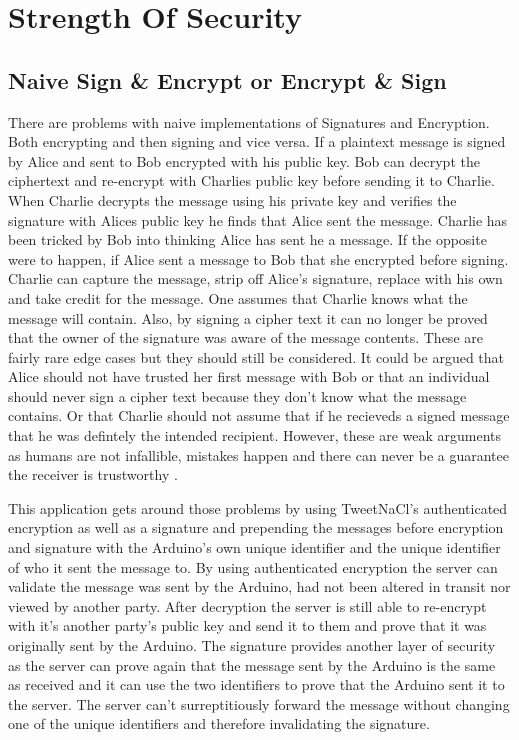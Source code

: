 
\chapter{Strength Of Security}
\label{stre}


\section{Naive Sign \& Encrypt or Encrypt \& Sign}

There are problems with naive implementations of Signatures and Encryption. Both encrypting and then signing and vice versa. If a plaintext message is signed by Alice and sent to Bob encrypted with his public key. Bob can decrypt the ciphertext and re-encrypt with Charlies public key before sending it to Charlie. When Charlie decrypts the message using his private key and verifies the signature with Alices public key he finds that Alice sent the message. Charlie has been tricked by Bob into thinking Alice has sent he a message. If the opposite were to happen, if Alice sent a message to Bob that she encrypted before signing. Charlie can capture the message, strip off Alice's signature, replace with his own and take credit for the message. One assumes that Charlie knows what the message will contain. Also, by signing a cipher text it can no longer be proved that the owner of the signature was aware of the message contents. These are fairly rare edge cases but they should still be considered. It could be argued that Alice should not have trusted her first message with Bob or that an individual should never sign a cipher text because they don't know what the message contains. Or that Charlie should not assume that if he recieveds a signed message that he was defintely the intended recipient.      However, these are weak arguments as humans are not infallible, mistakes happen and there can never be a guarantee the receiver is trustworthy \cite{signencrypt}.


This application gets around those problems by using TweetNaCl's authenticated encryption as well as a signature and prepending the messages before encryption and signature with the Arduino's own unique identifier and the unique identifier of who it sent the message to. By using authenticated encryption the server can validate the message was sent by the Arduino, had not been altered in transit nor viewed by another party. After decryption the server is still able to re-encrypt with it's another party's public key and send it to them and prove that it was originally sent by the Arduino. The signature provides another layer of security as the server can prove again that the message sent by the Arduino is the same as received and it can use the two identifiers to prove that the Arduino sent it to the server. The server can't surreptitiously forward the message without changing one of the unique identifiers and therefore invalidating the signature.



